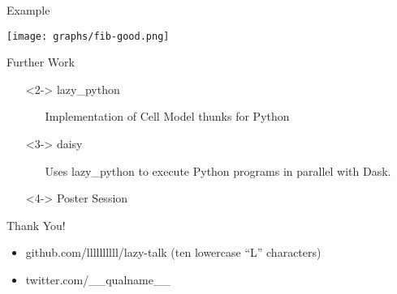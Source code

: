\documentclass{beamer}
\begin{document}
\begin{frame}{Example}
  \begin{center}
    \texttt{[image: graphs/fib-good.png]}
  \end{center}
\end{frame}

\begin{frame}{Further Work}
  \begin{itemize}
  \item[]<2-> lazy\_python
    \begin{itemize}
    \item[] Implementation of Cell Model thunks for Python
    \end{itemize}
  \item[]<3-> daisy
    \begin{itemize}
    \item[] Uses lazy\_python to execute Python programs in parallel with Dask.
    \end{itemize}
  \item[]<4-> Poster Session
  \end{itemize}
\end{frame}

\begin{frame}{Thank You!}
  \begin{itemize}
  \item github.com/llllllllll/lazy-talk (ten lowercase ``L'' characters)
  \item twitter.com/\_\_qualname\_\_
  \end{itemize}
\end{frame}
\end{document}
